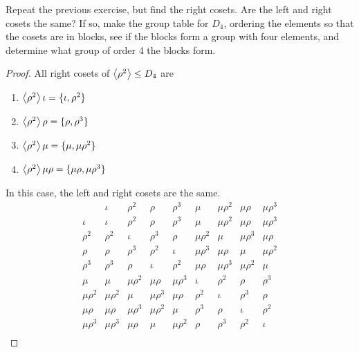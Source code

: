 \newpage
\begin{exercise}
    Repeat the previous exercise, but find the right cosets. Are the left and right cosets the same? If so, make the group table for $D_{4}$, ordering the elements so that the cosets are in blocks, see if the blocks form a group with four elements, and determine what group of order 4 the blocks form.
\end{exercise}

\begin{proof}
    All right cosets of $\left\langle{\rho^{2}}\right\rangle \leq D_{4}$ are
    \begin{enumerate}[label={(\arabic*)}]
        \item $\left\langle{\rho^{2}}\right\rangle\iota = \{ \iota, \rho^{2} \}$
        \item $\left\langle{\rho^{2}}\right\rangle\rho = \{ \rho, \rho^{3} \}$
        \item $\left\langle{\rho^{2}}\right\rangle\mu = \{ \mu, \mu\rho^{2} \}$
        \item $\left\langle{\rho^{2}}\right\rangle\mu\rho = \{ \mu\rho, \mu\rho^{3} \}$
    \end{enumerate}

    In this case, the left and right cosets are the same.
    \[
        \begin{array}{c||c|c||c|c||c|c||c|c}
                        & \iota       & \rho^{2}    & \rho        & \rho^{3}    & \mu         & \mu\rho^{2} & \mu\rho     & \mu\rho^{3} \\
            \hline\hline
            \iota       & \iota       & \rho^{2}    & \rho        & \rho^{3}    & \mu         & \mu\rho^{2} & \mu\rho     & \mu\rho^{3} \\
            \hline
            \rho^{2}    & \rho^{2}    & \iota       & \rho^{3}    & \rho        & \mu\rho^{2} & \mu         & \mu\rho^{3} & \mu\rho     \\
            \hline\hline
            \rho        & \rho        & \rho^{3}    & \rho^{2}    & \iota       & \mu\rho^{3} & \mu\rho     & \mu         & \mu\rho^{2} \\
            \hline
            \rho^{3}    & \rho^{3}    & \rho        & \iota       & \rho^{2}    & \mu\rho     & \mu\rho^{3} & \mu\rho^{2} & \mu         \\
            \hline\hline
            \mu         & \mu         & \mu\rho^{2} & \mu\rho     & \mu\rho^{3} & \iota       & \rho^{2}    & \rho        & \rho^{3}    \\
            \hline
            \mu\rho^{2} & \mu\rho^{2} & \mu         & \mu\rho^{3} & \mu\rho     & \rho^{2}    & \iota       & \rho^{3}    & \rho        \\
            \hline\hline
            \mu\rho     & \mu\rho     & \mu\rho^{3} & \mu\rho^{2} & \mu         & \rho^{3}    & \rho        & \iota       & \rho^{2}    \\
            \hline
            \mu\rho^{3} & \mu\rho^{3} & \mu\rho     & \mu         & \mu\rho^{2} & \rho        & \rho^{3}    & \rho^{2}    & \iota       \\
        \end{array}
    \]


\end{proof}
